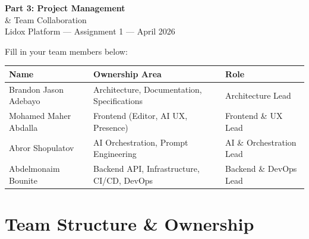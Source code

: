 \documentclass[10pt, a4paper]{article}
\begin{document}
\thispagestyle{empty}

\vspace*{0.6cm}
\vspace{0.4cm}

{\fontsize{26}{32}\selectfont\bfseries\color{white}Part 3: Project Management}\\[6pt]
{\fontsize{11}{15}\selectfont\color{accentMid}\& Team Collaboration}\\[3pt]
{\fontsize{9}{12}\selectfont\color{inkFaint}Lidox Platform --- Assignment 1 --- April 2026}

\vspace{2.8cm}

\begin{notebox}
\small Fill in your team members below:

\vspace{4pt}
\begin{tabularx}{\textwidth}{@{}lXl@{}}
\toprule
\textsf{\textbf{Name}} & \textsf{\textbf{Ownership Area}} & \textsf{\textbf{Role}} \\
\midrule
Brandon Jason Adebayo & Architecture, Documentation, Specifications & Architecture Lead \\
Mohamed Maher Abdalla & Frontend (Editor, AI UX, Presence) & Frontend \& UX Lead \\
Abror Shopulatov & AI Orchestration, Prompt Engineering & AI \& Orchestration Lead \\
Abdelmonaim Bounite & Backend API, Infrastructure, CI/CD, DevOps & Backend \& DevOps Lead \\
\bottomrule
\end{tabularx}
\end{notebox}

\newpage

\section{Team Structure \& Ownership}
\end{document}
